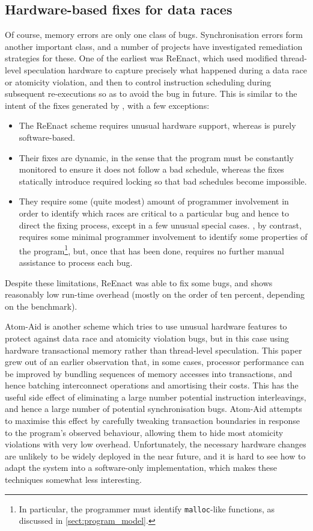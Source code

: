\subsection{Hardware-based fixes for data races}
Of course, memory errors are only one class of bugs.  Synchronisation
errors form another important class, and a number of projects have
investigated remediation strategies for these.  One of the earliest
was ReEnact\cite{Prvulovic2003a}, which used modified thread-level
speculation hardware to capture precisely what happened during a data
race or atomicity violation, and then to control instruction
scheduling during subsequent re-executions so as to avoid the bug in
future.  This is similar to the intent of the fixes generated by
{\technique}, with a few exceptions:
\begin{itemize}
\item The ReEnact scheme requires unusual hardware support, whereas
  {\technique} is purely software-based.
\item Their fixes are dynamic, in the sense that the program must be
  constantly monitored to ensure it does not follow a bad schedule,
  whereas the {\technique} fixes statically introduce required locking
  so that bad schedules become impossible.
\item They require some (quite modest) amount of programmer
  involvement in order to identify which races are critical to a
  particular bug and hence to direct the fixing process, except in a
  few unusual special cases.  {\Technique}, by contrast, requires some
  minimal programmer involvement to identify some properties of the
  program\footnote{In particular, the programmer must identify
    \texttt{malloc}-like functions, as discussed in
    \autoref{sect:program_model}.}, but, once that has been done,
  requires no further manual assistance to process each bug.
\end{itemize}
Despite these limitations, ReEnact was able to fix some bugs, and
shows reasonably low run-time overhead (mostly on the order of ten
percent, depending on the benchmark).

Atom-Aid\cite{Lucia2009} is another scheme which tries to use unusual
hardware features to protect against data race and atomicity violation
bugs, but in this case using hardware transactional
memory\cite{Herlihy1993} rather than thread-level speculation.  This
paper grew out of an earlier observation that, in some cases,
processor performance can be improved by bundling sequences of memory
accesses into transactions, and hence batching interconnect operations
and amortising their costs\cite{Ceze2007}.  This has the useful side
effect of eliminating a large number potential instruction
interleavings, and hence a large number of potential synchronisation
bugs.  Atom-Aid attempts to maximise this effect by carefully tweaking
transaction boundaries in response to the program's observed
behaviour, allowing them to hide most atomicity violations with very
low overhead.  Unfortunately, the necessary hardware changes are
unlikely to be widely deployed in the near future, and it is hard to
see how to adapt the system into a software-only implementation, which
makes these techniques somewhat less interesting.

